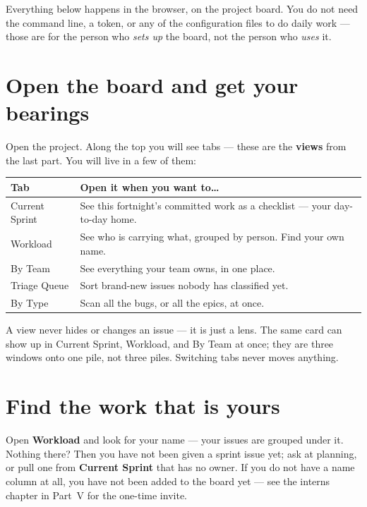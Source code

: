 \documentclass[11pt,a4paper]{report}
\begin{document}
Everything below happens in the browser, on the project board. You do not need the
command line, a token, or any of the configuration files to do daily work --- those
are for the person who \emph{sets up} the board, not the person who \emph{uses} it.

\section{Open the board and get your bearings}

Open the project. Along the top you will see tabs --- these are the \textbf{views}
from the last part. You will live in a few of them:

\begin{center}
\begin{tabular}{@{}p{3.4cm}p{9.8cm}@{}}
\toprule
\textbf{Tab} & \textbf{Open it when you want to\ldots} \\
\midrule
Current Sprint & See this fortnight's committed work as a checklist --- your day-to-day home. \\
Workload & See who is carrying what, grouped by person. Find your own name. \\
By Team & See everything your team owns, in one place. \\
Triage Queue & Sort brand-new issues nobody has classified yet. \\
By Type & Scan all the bugs, or all the epics, at once. \\
\bottomrule
\end{tabular}
\end{center}

\begin{plainenglish}
A view never hides or changes an issue --- it is just a lens. The same card can show
up in Current Sprint, Workload, and By Team at once; they are three windows onto one
pile, not three piles. Switching tabs never moves anything.
\end{plainenglish}

\section{Find the work that is yours}

Open \textbf{Workload} and look for your name --- your issues are grouped under it.
Nothing there? Then you have not been given a sprint issue yet; ask at planning, or
pull one from \textbf{Current Sprint} that has no owner. If you do not have a name
column at all, you have not been added to the board yet --- see the interns chapter
in Part~V for the one-time invite.
\end{document}
